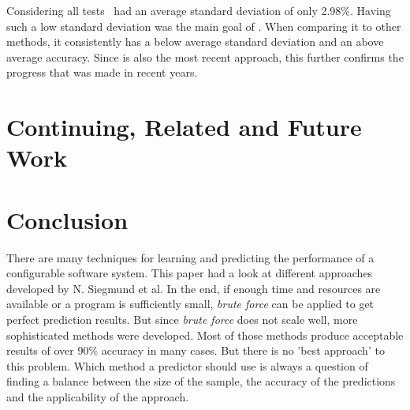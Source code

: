 Considering all tests \WHAT~had an average standard deviation of only 2.98\%. Having such a low standard deviation was the main goal of \WHAT. When comparing it to other methods, it consistently has a below average standard deviation and an above average accuracy. Since \WHAT is also the most recent approach, this further confirms the progress that was made in recent years.

\FloatBarrier
\section{Continuing, Related and Future Work}



\section{Conclusion}

There are many techniques for learning and predicting the performance of a configurable software system. This paper had a look at different approaches developed by N. Siegmund et al. In the end, if enough time and resources are available or a program is sufficiently small, \textit{brute force} can be applied to get perfect prediction results. But since \textit{brute force} does not scale well, more sophisticated methods were developed. Most of those methods produce acceptable results of over 90\% accuracy in many cases. But there is no 'best approach' to this problem. Which method a predictor should use is always a question of finding a balance between the size of the sample, the accuracy of the predictions and the applicability of the approach.

